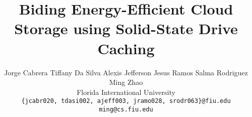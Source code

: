 \documentclass[letterpaper,twocolumn,10pt]{article}
\title{\Large \bf Biding Energy-Efficient Cloud Storage using Solid-State Drive
  Caching}
\author{
  \qquad
  {\rm Jorge Cabrera}
  \qquad
  {\rm Tiffany Da Silva}
  \qquad
  {\rm Alexis Jefferson}
  \qquad
  {\rm Jesus Ramos}
  \qquad
  {\rm Salma Rodriguez}
  \\
  \qquad
  {\rm Ming Zhao}
  \\
  Florida International University
  \\
  {\rm \texttt{\{jcabr020, tdasi002, ajeff003, jramo028, srodr063\}@fiu.edu}}
  \\
  {\rm \texttt{ming@cs.fiu.edu}}
}
\date{}
\begin{document}
\maketitle








% 



{
  \footnotesize
  
  
}
\end{document}

